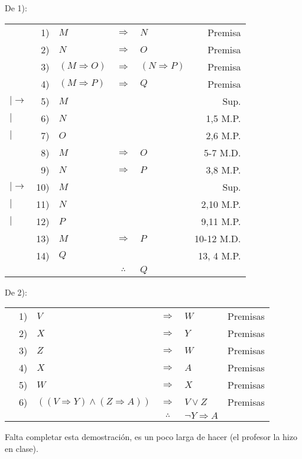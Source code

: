 \documentclass[12pt]{report}
\theoremstyle{largebreak}
\begin{document}
    \begin{sol}
        De 1):
        \begin{center}
            \begin{tabular}{l r l c l r}
                & 1) & $M$ & $\Rightarrow$ & $N$ & Premisa \\
                & 2) & $N$ & $\Rightarrow$ & $O$ & Premisa \\
                & 3) & $(M\Rightarrow O)$ & $\Rightarrow$ & $(N\Rightarrow P)$ & Premisa \\
                & 4) & $(M\Rightarrow P)$ & $\Rightarrow$ & $Q$ & Premisa \\
                $|\longrightarrow$ & 5) & $M$ &  &  & Sup. \\
                $|$ & 6) & $N$ &  &  & 1,5 M.P. \\
                $|$ & 7) & $O$ &  &  & 2,6 M.P. \\
                \hline
                & 8) & $M$ & $\Rightarrow$ & $O$ & 5-7 M.D. \\
                & 9) & $N$ & $\Rightarrow$ & $P$ & 3,8 M.P. \\
                $|\longrightarrow$ & 10) & $M$ &  &  & Sup. \\
                $|$ & 11) & $N$ &  &  & 2,10 M.P. \\
                $|$ & 12) & $P$ &  &  & 9,11 M.P. \\
                \hline
                 & 13) & $M$ & $\Rightarrow$ & $P$ & 10-12 M.D.\\
                 & 14) & $Q$ &  &  & 13, 4 M.P.\\
                \hline
                & & & $\therefore$ & $Q$ & \\
            \end{tabular}
        \end{center}

        De 2):
        \begin{center}
            \begin{tabular}{l r l c l r}
                & 1) & $V$ & $\Rightarrow$ & $W$ & Premisas \\
                & 2) & $X$ & $\Rightarrow$ & $Y$ & Premisas \\
                & 3) & $Z$ & $\Rightarrow$ & $W$ & Premisas \\
                & 4) & $X$ & $\Rightarrow$ & $A$ & Premisas \\
                & 5) & $W$ & $\Rightarrow$ & $X$ & Premisas \\
                & 6) & $((V\Rightarrow Y)\land(Z\Rightarrow A))$ & $\Rightarrow$ & $V\lor Z$ & Premisas \\
                \hline
                & & & $\therefore$ & $\neg Y\Rightarrow A$ & \\
            \end{tabular}
        \end{center}
        Falta completar esta demostración, es un poco larga de hacer (el profesor la hizo en clase).


\end{sol}
\end{document}
